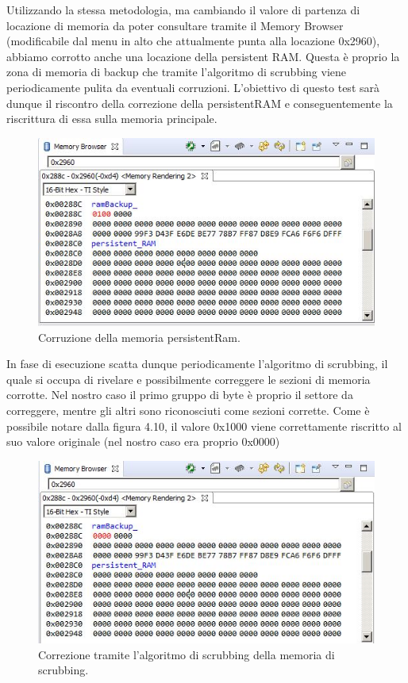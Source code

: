 \documentclass[LaM,binding=0.6cm]{../sapthesis}
\begin{document}
Utilizzando la stessa metodologia, ma cambiando il valore di partenza di locazione di memoria da poter consultare tramite il Memory Browser (modificabile dal menu in alto che attualmente punta alla locazione 0x2960), abbiamo corrotto anche una locazione della persistent RAM. 
Questa è proprio la zona di memoria di backup che tramite l'algoritmo di scrubbing viene periodicamente pulita da eventuali corruzioni. L'obiettivo di questo test sarà dunque il riscontro della correzione della persistentRAM e conseguentemente la riscrittura di essa sulla memoria principale.
\begin{figure}[htbp]
\centerline{\includegraphics[scale=0.8]{examples/5_PersistentRamCorruzione.JPG}}
\caption{Corruzione della memoria persistentRam.}
\label{fig}
\end{figure}
\newline
In fase di esecuzione scatta dunque periodicamente l'algoritmo di scrubbing, il quale si occupa di rivelare e possibilmente correggere le sezioni di memoria corrotte. Nel nostro caso il primo gruppo di byte è proprio il settore da correggere, mentre gli altri sono riconosciuti come sezioni corrette. Come è possibile notare dalla figura 4.10, il valore 0x1000 viene correttamente riscritto al suo valore originale (nel nostro caso era proprio 0x0000)

\begin{figure}[htbp]
\centerline{\includegraphics[scale=0.8]{examples/6_ScrubbingPersistentRamRiuscita.JPG}}
\caption{Correzione tramite l'algoritmo di scrubbing della memoria di scrubbing.}
\label{fig}
\end{figure}
\vspace{0.5cm}
\end{document}
